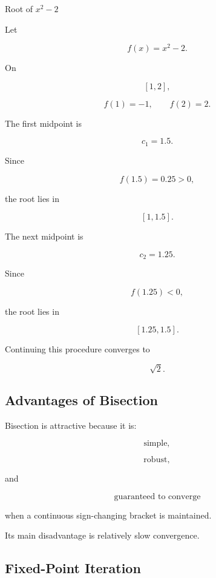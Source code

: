 \begin{workedexamplebox}{Root of \(x^2-2\)}

Let

\[
f(x)=x^2-2.
\]

On

\[
[1,2],
\]

\[
f(1)=-1,
\qquad
f(2)=2.
\]

The first midpoint is

\[
c_1=1.5.
\]

Since

\[
f(1.5)=0.25>0,
\]

the root lies in

\[
[1,1.5].
\]

The next midpoint is

\[
c_2=1.25.
\]

Since

\[
f(1.25)<0,
\]

the root lies in

\[
[1.25,1.5].
\]

Continuing this procedure converges to

\[
\boxed{
\sqrt{2}.
}
\]

\end{workedexamplebox}

\subsection{Advantages of Bisection}
\label{subsec:bisection-advantages}

Bisection is attractive because it is:

\[
\boxed{
\text{simple},
}
\]

\[
\boxed{
\text{robust},
}
\]

and

\[
\boxed{
\text{guaranteed to converge}
}
\]

when a continuous sign-changing bracket is maintained.

Its main disadvantage is relatively slow convergence.

\subsection{Fixed-Point Iteration}
\label{subsec:fixed-point-iteration}

